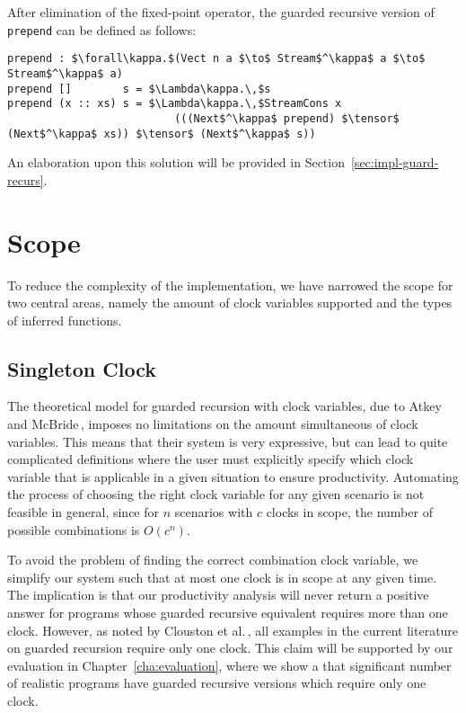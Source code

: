 After elimination of the fixed-point operator, the guarded recursive version of
\texttt{prepend} can be defined as follows:

\begin{lstlisting}[mathescape]
prepend : $\forall\kappa.$(Vect n a $\to$ Stream$^\kappa$ a $\to$ Stream$^\kappa$ a)
prepend []        s = $\Lambda\kappa.\,$s
prepend (x :: xs) s = $\Lambda\kappa.\,$StreamCons x 
                          (((Next$^\kappa$ prepend) $\tensor$ (Next$^\kappa$ xs)) $\tensor$ (Next$^\kappa$ s))
\end{lstlisting}

An elaboration upon this solution will be provided in Section~\ref{sec:impl-guard-recurs}.

\section{Scope}
To reduce the complexity of the implementation, we have narrowed the scope for
two central areas, namely the amount of clock variables supported and the types
of inferred functions.

\subsection{Singleton Clock}

The theoretical model for guarded recursion with clock variables, due to Atkey
and McBride\,\citep{Atkey:2013}, imposes no limitations on the amount
simultaneous of clock variables. This means that their system is very
expressive, but can lead to quite complicated definitions where the user must
explicitly specify which clock variable that is applicable in a given situation to ensure
productivity. Automating the process of choosing the right clock variable for
any given scenario is not feasible in general, since for $n$ scenarios with $c$
clocks in scope, the number of possible combinations is $O(c^n)$.

To avoid the problem of finding the correct combination clock variable, we
simplify our system such that at most one clock is in scope at any given
time. The implication is that our productivity analysis will never return a
positive answer for programs whose guarded recursive equivalent requires more
than one clock. However, as noted by Clouston et
al.\,\citep{BirkedalL:guarded-lambda-conf}, all examples in the current literature
on guarded recursion require only one clock. This claim will be supported by our
evaluation in Chapter~\ref{cha:evaluation}, where we show a that significant number of
realistic programs have guarded recursive versions which require only one clock.

